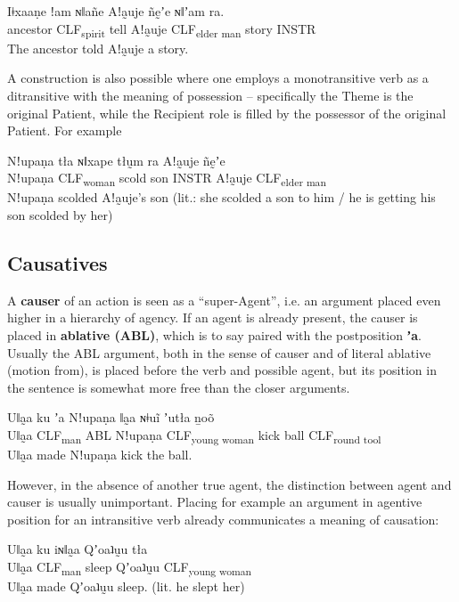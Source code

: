 \documentclass[11pt,a5paper]{book}
\newcommand{\qcn}[1]{\textcolor{AccentText}{\large\textbf{#1}}}
\newcommand{\grammsc}[1]{\textsc{#1}}
\newcommand{\CLF}[1]{\grammsc{CLF}\textsubscript{#1}}
\newcommand{\INSTR}{\grammsc{INSTR}}
\begin{document}
\begin{exe}
\ex
\gll Iǂxaaṇe ǃam ɴǁañe Aǃa̰uje ñḛʼe ɴǁʼam ra.\\
ancestor \CLF{spirit} tell Aǃa̰uje \CLF{elder man} story  \INSTR \\
\glt The ancestor told Aǃa̰uje a story.
\end{exe}

A construction is also possible where one employs a monotransitive verb as a ditransitive with the meaning of possession -- specifically the Theme is the original Patient, while the Recipient role is filled by the possessor of the original Patient. For example

\begin{exe}
	\ex
	\gll Nǃupaṇa 	tła ɴǁxape tłṵm ra  Aǃa̰uje ñḛʼe 	 \\
		Nǃupaṇa 	\CLF{woman} 	scold son \INSTR{} Aǃa̰uje \CLF{elder man}\\
	\glt Nǃupaṇa scolded Aǃa̰uje's son  (lit.: she scolded a son to him / he is getting his son scolded by her)
\end{exe}


\subsection{Causatives}

A \textbf{causer} of an action is seen as a ``super-Agent'', i.e. an argument placed even higher in a hierarchy of agency. If an agent is already present, the causer is placed in \textbf{ablative (ABL)}, which is to say paired with the postposition \qcn{ʼa}. Usually the ABL argument, both in the sense of causer and of literal ablative (motion from), is placed before the verb and possible agent, but its position in the sentence is somewhat more free than the closer arguments.

\begin{exe}
\ex
\gll Uǁa̰a ku ʼa Nǃupaṇa ǁa̰a ɴǂuĩ 	 	ʼutła 	ṉoõ\\
Uǁa̰a \CLF{man} ABL Nǃupaṇa \CLF{young woman} kick ball \CLF{round tool}\\
\glt Uǁa̰a made Nǃupaṇa kick the ball.
\end{exe}

However, in the absence of another true agent, the distinction between agent and causer is usually unimportant. Placing for example an argument in agentive position for an intransitive verb already communicates a meaning of causation:

\begin{exe}
\ex
\gll Uǁa̰a ku iɴǁa̰a Qʼoaʇṵu tła\\
Uǁa̰a \CLF{man} sleep Qʼoaʇṵu \CLF{young woman}\\
\glt Uǁa̰a made Qʼoaʇṵu sleep. (lit. he slept her)
\end{exe}
\end{document}
